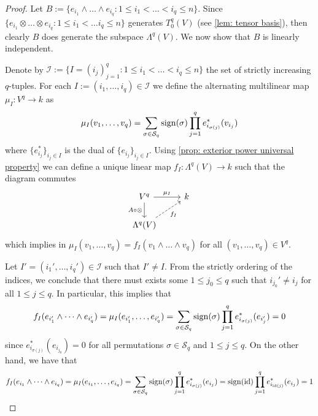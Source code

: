 \begin{proof}
  Let \(B := \{e_{i_1} \wedge \dots \wedge e_{i_q} : 1 \leq i_1 < \dots < i_q
  \leq n\}\). Since \(\{e_{i_1} \otimes \dots \otimes e_{i_q} : 1 \leq i_1 <
  \dots i_q \leq n\}\) generates \(T_0^q(V)\) (see \cref{lem: tensor basis}),
  then clearly \(B\) does generate the subspace \(\Lambda^q(V)\). We now show
  that \(B\) is linearly independent.

  Denote by \(\mathcal I := \{I = (i_j)_{j=1}^q : 1 \leq i_1 < \dots < i_q \leq
  n\}\) the set of strictly increasing \(q\)-tuples. For each \(I := (i_1,
  \dots, i_q) \in \mathcal I\) we define the alternating multilinear map \(\mu_I
  : V^q \to k\) as
  \[
    \mu_I(v_1, \dots, v_q) = \sum_{\sigma \in \mathcal S_q}
    \operatorname{sign}(\sigma) \prod_{j=1}^q e_{i_{\sigma(j)}}^*(v_{i_j})
  \]
  where \(\{e_{i_j}^*\}_{i_j \in I}\) is the dual of \(\{e_{i_j}\}_{i_j
  \in I}\). Using \cref{prop: exterior power universal property} we can
  define a unique linear map \(f_I: \Lambda^q(V) \to k\) such that the diagram
  commutes
  \[
    \begin{tikzcd}
      V^q \ar[r, "\mu_I"] \ar[d, swap, "A \circ \otimes"] &k \\
      \Lambda^q(V) \ar[ur, dashed, swap, "f_I"]
    \end{tikzcd}
  \]
  which implies in \(\mu_I(v_1, \dots, v_q) = f_I(v_1 \wedge \dots \wedge v_q)\)
  for all \((v_1, \dots, v_q) \in V^q\).

  Let \(I' = (i_1', \dots, i_q') \in \mathcal I\) such that \(I' \neq I\). From
  the strictly ordering of the indices, we conclude that there must exists some
  \(1 \leq j_0 \leq q\) such that \(i_{j_0}' \neq i_j\) for all \(1 \leq j \leq
  q\). In particular, this implies that
  \[
    f_I(e_{i_1'} \wedge \dots \wedge e_{i_q'}) = \mu_I(e_{i_1'}, \dots,
    e_{i_q'}) = \sum_{\sigma \in \mathcal S_q} \operatorname{sign}(\sigma)
    \prod_{j=1}^q e_{i_{\sigma(j)}}^*(e_{i_j'}) = 0
  \]
  since \(e_{i_{\sigma(j)}}^*(e_{i_{j_0}}) = 0\) for all permutations \(\sigma
  \in \mathcal S_q\) and \(1 \leq j \leq q\). On the other hand, we have that
  \[
    f_I(e_{i_1} \wedge \dots \wedge e_{i_q}) = \mu_I(e_{i_1}, \dots, e_{i_q})
    = \sum_{\sigma \in \mathcal S_q} \operatorname{sign}(\sigma) \prod_{j=1}^q
    e_{i_{\sigma(j)}}^*(e_{i_j})
    = \operatorname{sign}(\operatorname{id}) \prod_{j=1}^q e_{i_{\operatorname{id}(j)}}^*(e_{i_j})
    = 1
  \]


\end{proof}
